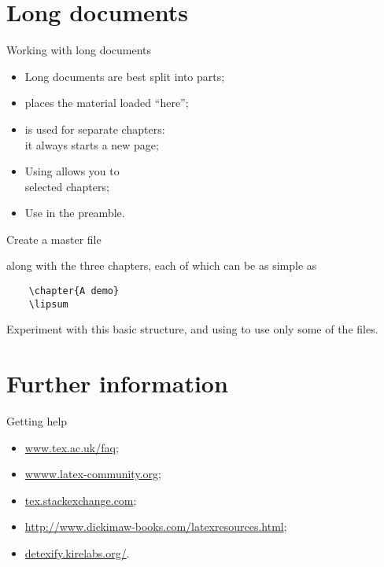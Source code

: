 \section{Long documents}

\begin{frame}{Working with long documents}

  \begin{itemize}
    \item Long documents are best split into parts;
    \item {} places the material loaded \enquote{here};
    \item {} is used for separate chapters:\\ it always starts
      a new page;
    \item Using  allows you to \\
      selected chapters;
    \item Use  in the preamble.
  \end{itemize}
  
\end{frame}

\begin{exercise}

  Create a master file
  
  along with the three chapters, each of which can be as simple as
  \begin{verbatim}
    \chapter{A demo}
    \lipsum
  \end{verbatim}
  Experiment with this basic structure, and using  to
  use only some of the files.

\end{exercise}


\section{Further information}

\begin{frame}{Getting help}

  \begin{itemize}
    \item \url{www.tex.ac.uk/faq};
    \item \url{wwww.latex-community.org};
    \item \url{tex.stackexchange.com};
    \item \url{http://www.dickimaw-books.com/latexresources.html};
    \item \url{detexify.kirelabs.org/}.
  \end{itemize}

\end{frame}

